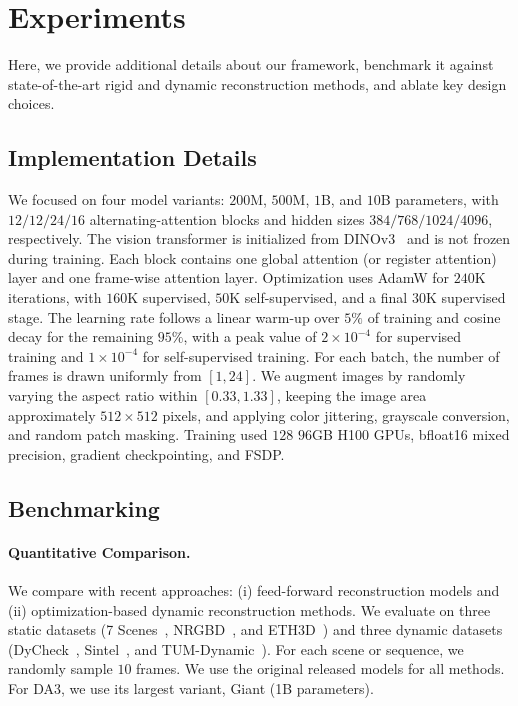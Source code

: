 \section{Experiments}%
\label{sec:experiments}

Here, we provide additional details about our framework, benchmark it against state-of-the-art rigid and dynamic reconstruction methods, and ablate key design choices.

\subsection{Implementation Details}

We focused on four model variants: $200$M, $500$M, $1$B, and $10$B parameters, with $12/12/24/16$ alternating-attention blocks and hidden sizes $384/768/1024/4096$, respectively.
The vision transformer is initialized from DINOv3~\cite{simeoni25dinov3} and is not frozen during training.
Each block contains one global attention (or register attention) layer and one frame-wise attention layer.
Optimization uses AdamW for $240$K iterations, with $160$K supervised, $50$K self-supervised, and a final $30$K supervised stage.
The learning rate follows a linear warm-up over $5\%$ of training and cosine decay for the remaining $95\%$, with a peak value of $2\times10^{-4}$ for supervised training and $1\times10^{-4}$ for self-supervised training.
For each batch, the number of frames is drawn uniformly from $[1,24]$.
We augment images by randomly varying the aspect ratio within \([0.33,1.33]\), keeping the image area approximately $512 \times 512$ pixels, and applying color jittering, grayscale conversion, and random patch masking.
Training used $128$ $96$GB H100 GPUs, bfloat16 mixed precision, gradient checkpointing, and FSDP.

\subsection{Benchmarking}%
\label{sec:benchmarking}



\paragraph{Quantitative Comparison.}



We compare \method with recent approaches:
(i) feed-forward reconstruction models and (ii) optimization-based dynamic reconstruction methods.
We evaluate on three static datasets (7 Scenes~\cite{shotton13scene}, NRGBD~\cite{azinovic22neural}, and ETH3D~\cite{schops17a-multi-view}) and three dynamic datasets (DyCheck~\cite{gao22monocular}, Sintel~\cite{butler12a-naturalistic}, and TUM-Dynamic~\cite{sturm12a-benchmark}).
For each scene or sequence, we randomly sample $10$ frames.
We use the original released models for all methods.
For DA3, we use its largest variant, Giant (1B parameters).

